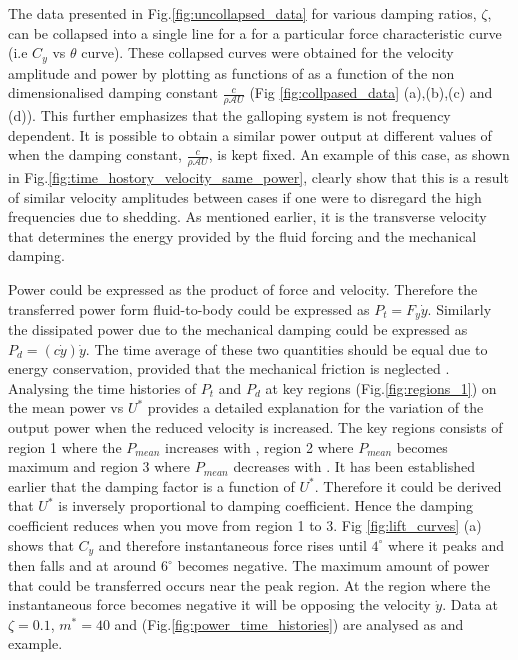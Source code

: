  The data presented in Fig.\ref{fig:uncollapsed_data} for various damping ratios, $\zeta$, can be collapsed into a single line for a for a particular force characteristic curve (i.e $C_y$ vs $\theta$ curve). These collapsed curves were  obtained for the velocity amplitude  and power by plotting as functions of as a function of  the non dimensionalised  damping constant $\frac{c}{\rho\mathcal{A}U}$ 
(Fig \ref{fig:collpased_data} (a),(b),(c) and (d)).  This further emphasizes that the galloping system is not frequency dependent. It is possible to obtain a similar power output at different values of \ustar when the damping constant, $\frac{c}{\rho\mathcal{A}U}$, is kept fixed. An example of this case, as shown in Fig.\ref{fig:time_hostory_velocity_same_power}, clearly show that this is a result of similar velocity amplitudes between cases if one were to disregard the high frequencies due to shedding. As mentioned earlier, it is the transverse velocity that determines the energy provided by the fluid forcing and the mechanical damping.


 



 
 Power could be expressed as the product of force and velocity. Therefore the transferred power form fluid-to-body could be expressed as $P_t=F_y\dot{y}$. Similarly the dissipated power due to the mechanical damping could be expressed as $P_d=(c\dot{y})\dot{y}$. The time average of these two quantities should be equal due to energy conservation, provided that the mechanical friction is neglected . Analysing the  time histories of $P_t $ and $P_d$ at key regions (Fig.\ref{fig:regions_1}) on the mean power vs $U^*$ provides a detailed explanation for the variation of the output power when the reduced velocity is increased. The key regions consists of region 1 where the $P_{mean}$ increases with \ustar, region 2 where $P_{mean}$ becomes maximum and region 3 where $P_{mean}$ decreases with \ustar. It has been established earlier that the damping factor is a function of $U^*$. Therefore it could be derived that $U^*$ is inversely proportional to damping coefficient. Hence the damping coefficient reduces when you move from region 1 to 3. Fig \ref{fig:lift_curves} (a) shows that $C_y$ and therefore instantaneous force rises until $4^\circ$ where it peaks and then falls and at around $6^\circ$ becomes negative. The maximum amount of power that could be transferred occurs near the peak region. At the region where the instantaneous force becomes negative it will be opposing the velocity $\dot{y}$. Data at $\zeta=0.1$, $m^*=40$ and  (Fig.\ref{fig:power_time_histories}) are analysed as and example.  

